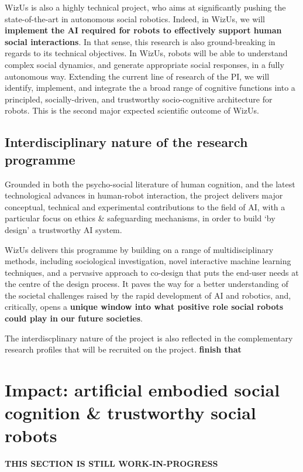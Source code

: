 \documentclass[11pt,a4paper]{report}
\newcommand{\project}{WizUs\xspace}
\newcommand{\TODO}[1]{{\color{red}\textbf{#1}}}
\begin{document}
\project is also a highly technical project, who aims at significantly
pushing the state-of-the-art in autonomous social robotics. Indeed, in \project, we will
\textbf{implement the AI required for robots to effectively support
human social interactions}.  In that sense, this research is also
ground-breaking in regards to its technical objectives. In \project, robots will
be able to understand complex social dynamics, and generate appropriate social
responses, in a fully autonomous way.  Extending the current line of research of
the PI, we will identify, implement, and integrate the a broad range of cognitive functions into a
principled, socially-driven, and trustworthy socio-cognitive architecture for
robots. This is the second major expected scientific outcome of \project.


\subsection{Interdisciplinary nature of the research programme}


Grounded in both the psycho-social literature of human cognition, and the latest
technological advances in human-robot interaction, the project delivers
major conceptual, technical and experimental contributions to the field of AI, 
with a particular focus on ethics \& safeguarding mechanisms, in order to build `by 
design' a trustworthy AI system.

\project delivers this programme by building on a range of multidisciplinary
methods, including sociological investigation, novel interactive machine
learning techniques, and a pervasive approach to co-design that puts the
end-user needs at the centre of the design process. It paves the way for a
better understanding of the societal challenges raised by the rapid development
of AI and robotics, and, critically, opens a \textbf{unique window into what
positive role social robots could play in our future societies}.

The interdiscplinary nature of the project is also reflected in the
complementary research profiles that will be recruited on the project.
\TODO{finish that}


\section{Impact: artificial embodied social cognition \& trustworthy social robots}
\TODO{THIS SECTION IS STILL WORK-IN-PROGRESS}
\end{document}
